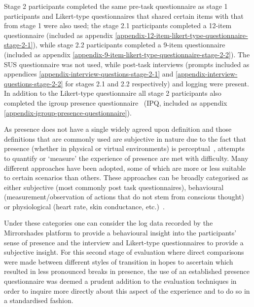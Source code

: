 Stage 2 participants completed the same pre-task questionnaire as stage 1 participants and Likert-type questionnaires that shared certain items with that from stage 1 were also used; the stage 2.1 participants completed a 12-item questionnaire (included as appendix \ref{appendix-12-item-likert-type-questionnaire-stage-2-1}), while stage 2.2 participants completed a 9-item questionnaire (included as appendix \ref{appendix-9-item-likert-type-questionnaire-stage-2-2}). The SUS questionnaire was not used, while post-task interviews (prompts included as appendices \ref{appendix-interview-questions-stage-2-1} and \ref{appendix-interview-questions-stage-2-2} for stages 2.1 and 2.2 respectively) and logging were present. In addition to the Likert-type questionnaire all stage 2 participants also completed the igroup presence questionnaire~\cite{Schubert2001} (IPQ, included as appendix \ref{appendix-igroup-presence-questionnaire}).

As presence does not have a single widely agreed upon definition and those definitions that are commonly used are subjective in nature due to the fact that presence (whether in physical or virtual environments) is perceptual~\cite{Waterworth2014}, attempts to quantify or `measure' the experience of presence are met with difficulty. Many different approaches have been adopted, some of which are more or less suitable to certain scenarios than others. These approaches can be broadly categorised as either subjective (most commonly post task questionnaires), behavioural (measurement/observation of actions that do not stem from conscious thought) or physiological (heart rate, skin conductance, etc.)~\cite{Insko2003}.

Under these categories one can consider the log data recorded by the Mirrorshades platform to provide a behavioural insight into the participants' sense of presence and the interview and Likert-type questionnaires to provide a subjective insight. For this second stage of evaluation where direct comparisons were made between different styles of transition in hopes to ascertain which resulted in less pronounced breaks in presence, the use of an established presence questionnaire was deemed a prudent addition to the evaluation techniques in order to inquire more directly about this aspect of the experience and to do so in a standardised fashion.


